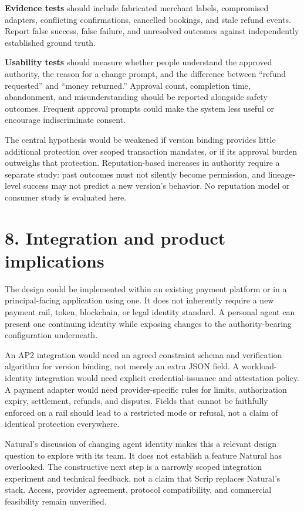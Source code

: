 \documentclass[
  11pt,
  letterpaper,
]{article}
\begin{document}
\textbf{Evidence tests} should include fabricated merchant labels,
compromised adapters, conflicting confirmations, cancelled bookings, and
stale refund events. Report false success, false failure, and unresolved
outcomes against independently established ground truth.

\textbf{Usability tests} should measure whether people understand the
approved authority, the reason for a change prompt, and the difference
between ``refund requested'' and ``money returned.'' Approval count,
completion time, abandonment, and misunderstanding should be reported
alongside safety outcomes. Frequent approval prompts could make the
system less useful or encourage indiscriminate consent.

The central hypothesis would be weakened if version binding provides
little additional protection over scoped transaction mandates, or if its
approval burden outweighs that protection. Reputation-based increases in
authority require a separate study: past outcomes must not silently
become permission, and lineage-level success may not predict a new
version's behavior. No reputation model or consumer study is evaluated
here.

\section{8. Integration and product
implications}\label{integration-and-product-implications}

The design could be implemented within an existing payment platform or
in a principal-facing application using one. It does not inherently
require a new payment rail, token, blockchain, or legal identity
standard. A personal agent can present one continuing identity while
exposing changes to the authority-bearing configuration underneath.

An AP2 integration would need an agreed constraint schema and
verification algorithm for version binding, not merely an extra JSON
field. A workload-identity integration would need explicit
credential-issuance and attestation policy. A payment adapter would need
provider-specific rules for limits, authorization expiry, settlement,
refunds, and disputes. Fields that cannot be faithfully enforced on a
rail should lead to a restricted mode or refusal, not a claim of
identical protection everywhere.

Natural's discussion of changing agent identity makes this a relevant
design question to explore with its team. It does not establish a
feature Natural has overlooked. The constructive next step is a narrowly
scoped integration experiment and technical feedback, not a claim that
Scrip replaces Natural's stack. Access, provider agreement, protocol
compatibility, and commercial feasibility remain unverified.
\end{document}
